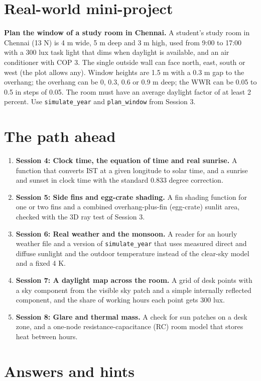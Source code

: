 \documentclass[11pt,a4paper]{article}
\begin{document}
\section{Real-world mini-project}
\textbf{Plan the window of a study room in Chennai.} A student's study room in Chennai (13 N) is 4 m wide, 5 m deep and 3 m high, used from 9:00 to 17:00 with a 300 lux task light that dims when daylight is available, and an air conditioner with COP 3. The single outside wall can face north, east, south or west (the plot allows any). Window heights are 1.5 m with a 0.3 m gap to the overhang; the overhang can be 0, 0.3, 0.6 or 0.9 m deep; the WWR can be 0.05 to 0.5 in steps of 0.05. The room must have an average daylight factor of at least 2 percent. Use \texttt{simulate\_year} and \texttt{plan\_window} from Session 3.

\section{The path ahead}
\begin{enumerate}[nosep]
\item \textbf{Session 4: Clock time, the equation of time and real sunrise.} A function that converts IST at a given longitude to solar time, and a sunrise and sunset in clock time with the standard 0.833 degree correction.
\item \textbf{Session 5: Side fins and egg-crate shading.} A fin shading function for one or two fins and a combined overhang-plus-fin (egg-crate) sunlit area, checked with the 3D ray test of Session 3.
\item \textbf{Session 6: Real weather and the monsoon.} A reader for an hourly weather file and a version of \texttt{simulate\_year} that uses measured direct and diffuse sunlight and the outdoor temperature instead of the clear-sky model and a fixed 4 K.
\item \textbf{Session 7: A daylight map across the room.} A grid of desk points with a sky component from the visible sky patch and a simple internally reflected component, and the share of working hours each point gets 300 lux.
\item \textbf{Session 8: Glare and thermal mass.} A check for sun patches on a desk zone, and a one-node resistance-capacitance (RC) room model that stores heat between hours.
\end{enumerate}

\section{Answers and hints}
\end{document}
